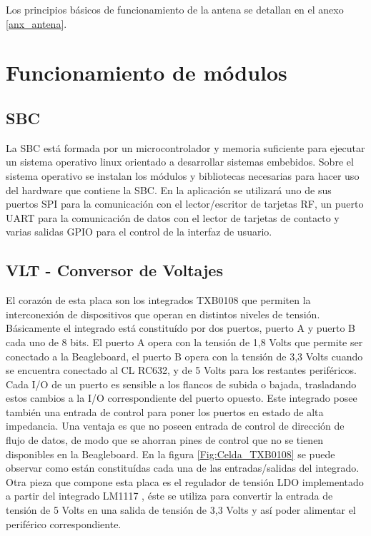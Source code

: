 Los principios básicos de funcionamiento de la antena se detallan en el anexo \ref{anx_antena}.

\section{Funcionamiento de m\'odulos}

\subsection{SBC}
La SBC está formada por un microcontrolador y memoria suficiente para ejecutar un sistema operativo linux orientado a desarrollar sistemas embebidos. Sobre el sistema operativo se instalan los módulos y bibliotecas necesarias para hacer uso del hardware que contiene la SBC. En la aplicación se utilizará uno de sus puertos SPI para la comunicación con el lector/escritor de tarjetas RF, un puerto UART para la comunicación de datos con el lector de tarjetas de contacto y varias salidas GPIO para el control de la interfaz de usuario.

\subsection{VLT - Conversor de Voltajes}
El corazón de esta placa son los integrados TXB0108 \cite{HD_VLT} que permiten la interconexión de dispositivos que operan en distintos niveles de tensión. Básicamente el integrado está constituído por dos puertos, puerto A y puerto B cada uno de 8 bits. El puerto A opera con la tensión de 1,8 Volts que permite ser conectado a la Beagleboard, el puerto B opera con la tensión de 3,3 Volts cuando se encuentra conectado al CL RC632, y de 5 Volts para los restantes periféricos.
Cada I/O de un puerto es sensible a los flancos de subida o bajada, trasladando estos cambios a la I/O correspondiente del puerto opuesto. 
Este integrado posee también una entrada de control para poner los puertos en estado de alta impedancia.
Una ventaja es que no poseen entrada de control de dirección de flujo de datos, de modo que se ahorran pines de control que no se tienen disponibles en la Beagleboard.
En la figura \ref{Fig:Celda_TXB0108} se puede observar como están constituídas cada una de las entradas/salidas del integrado.
Otra pieza que compone esta placa es el regulador de tensión LDO implementado a partir del integrado LM1117 \cite{LDO}, éste se utiliza para convertir la entrada de tensión de 5 Volts en una salida de tensión de 3,3 Volts y así poder alimentar el periférico correspondiente.


